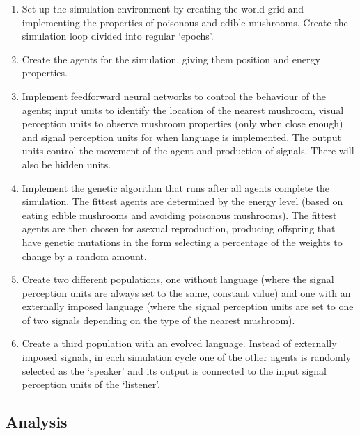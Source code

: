 \documentclass[12pt]{article}
\begin{document}
\begin{enumerate}

\item Set up the simulation environment by creating the world grid and implementing the properties of poisonous and edible mushrooms. Create the simulation loop divided into regular `epochs'.

\item Create the agents for the simulation, giving them position and energy properties.

\item Implement feedforward neural networks to control the behaviour of the agents; input units to identify the location of the nearest mushroom, visual perception units to observe mushroom properties (only when close enough) and signal perception units for when language is implemented. The output units control the movement of the agent and production of signals. There will also be hidden units.

\item Implement the genetic algorithm that runs after all agents complete the simulation. The fittest agents are determined by the energy level (based on eating edible mushrooms and avoiding poisonous mushrooms). The fittest agents are then chosen for asexual reproduction, producing offspring that have genetic mutations in the form selecting a percentage of the weights to change by a random amount.

\item Create two different populations, one without language (where the signal perception units are always set to the same, constant value) and one with an externally imposed language (where the signal perception units are set to one of two signals depending on the type of the nearest mushroom).

\item Create a third population with an evolved language. Instead of externally imposed signals, in each simulation cycle one of the other agents is randomly selected as the `speaker' and its output is connected to the input signal perception units of the `listener'. 

\end{enumerate}

\subsection*{Analysis}
\end{document}
